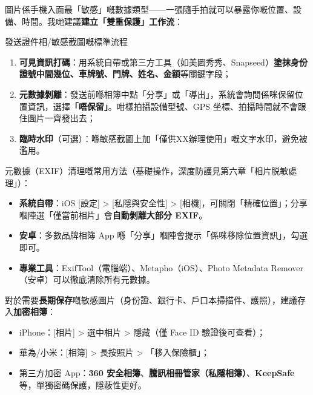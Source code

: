 
圖片係手機入面最「敏感」嘅數據類型——一張隨手拍就可以暴露你嘅位置、設備、時間。我哋建議\textbf{建立「雙重保護」工作流}：

\begin{tcbwarn}{發送證件相/敏感截圖嘅標準流程}
\begin{enumerate}
  \item \textbf{可見資訊打碼}：用系統自帶或第三方工具（如美圖秀秀、Snapseed）\textbf{塗抹身份證號中間幾位、車牌號、門牌、姓名、金額}等關鍵字段；
  \item \textbf{元數據剝離}：發送前喺相簿中點「分享」或「導出」，系統會詢問係咪保留位置資訊，選擇\textbf{「唔保留」}。咁樣拍攝設備型號、GPS 坐標、拍攝時間就不會跟住圖片一齊發出去；
  \item \textbf{臨時水印}（可選）：喺敏感截圖上加「僅供XX辦理使用」嘅文字水印，避免被濫用。
\end{enumerate}

\end{tcbwarn}

元數據（EXIF）清理嘅常用方法（基礎操作，深度防護見第六章「相片脱敏處理」）：

\begin{itemize}
  \item \textbf{系統自帶}：iOS [設定] > [私隱與安全性] > [相機]，可關閉「精確位置」；分享嗰陣選「僅當前相片」會\textbf{自動剝離大部分 EXIF}。
  \item \textbf{安卓}：多數品牌相簿 App 喺「分享」嗰陣會提示「係咪移除位置資訊」，勾選即可。
  \item \textbf{專業工具}：ExifTool（電腦端）、Metapho（iOS）、Photo Metadata Remover（安卓）可以徹底清除所有元數據。
\end{itemize}

對於需要\textbf{長期保存}嘅敏感圖片（身份證、銀行卡、戶口本掃描件、護照），建議存入\textbf{加密相簿}：

\begin{itemize}
  \item iPhone：[相片] > 選中相片 > 隱藏（僅 Face ID 驗證後可查看）；
  \item 華為/小米：[相簿] > 長按照片 > 「移入保險櫃」；
  \item 第三方加密 App：\textbf{360 安全相簿}、\textbf{騰訊相冊管家（私隱相簿）}、\textbf{KeepSafe}等，單獨密碼保護，隱蔽性更好。
\end{itemize}
